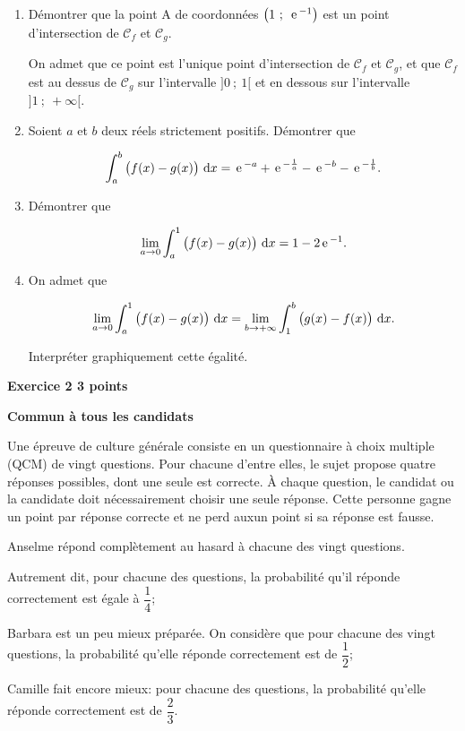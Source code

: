 \documentclass[10pt,a4paper]{article}
\renewcommand{\d}{\mathrm{\,d}}%
\newcommand{\e}{\mathrm{\,e\,}}%
\newcommand{\ds}{\displaystyle}
\begin{document}
\begin{enumerate}
\item Démontrer que la point A de coordonnées $\left (1~;~\e^{-1}\strut\right )$ est un point d'intersection de $\mathcal{C}_f$ et $\mathcal{C}_g$.

\smallskip

On admet que ce point est l'unique point d'intersection de $\mathcal{C}_f$ et $\mathcal{C}_g$, et que $\mathcal{C}_f$ est au dessus de $\mathcal{C}_g$ sur l'intervalle $]0~;~1[$ et en dessous sur l'intervalle $]1~;~+\infty[$.

\item Soient $a$ et $b$ deux réels strictement positifs. Démontrer que

\[\ds\int_{a}^{b} \left ( f(x)-g(x)\strut\right ) \d x = \e^{-a} + \e^{-\frac{1}{a}} - \e^{-b} - \e^{-\frac{1}{b}}.\]

\item Démontrer que

\[\ds\lim_{a\to 0} \ds\int_{a}^{1} \left ( f(x)-g(x)\strut\right ) \d x =1-2\e^{-1}.\]

\item On admet que

\[\ds\lim_{a\to 0} \ds\int_{a}^{1} \left ( f(x)-g(x)\strut\right ) \d x =\ds\lim_{b\to +\infty} \ds\int_{1}^{b} \left ( g(x)-f(x)\strut\right ) \d x .\]

Interpréter graphiquement cette égalité.

\end{enumerate}

\vspace{0,25cm}

\textbf{Exercice 2 \hfill 3 points}

\medskip

\textbf{Commun à tous les candidats}

\bigskip

Une épreuve de culture générale consiste en un questionnaire à choix multiple (QCM) de vingt questions. Pour chacune d'entre elles, le sujet propose quatre réponses possibles, dont une seule est correcte. À chaque question, le candidat ou la candidate doit nécessairement choisir une seule réponse. Cette personne gagne un point par réponse correcte et ne perd auxun point si sa réponse est fausse.

\medskip

\begin{list}{\textbullet}{On considère trois candidats:}
\item Anselme répond complètement au hasard à chacune des vingt questions.

Autrement dit, pour chacune des questions, la probabilité qu'il réponde correctement est égale à $\dfrac{1}{4}$;
\item Barbara est un peu mieux préparée. On considère que pour chacune des vingt questions, la probabilité qu'elle réponde correctement est de $\dfrac{1}{2}$;
\item Camille fait encore mieux: pour chacune des questions, la probabilité qu'elle réponde correctement est de $\dfrac{2}{3}$.
\end{list}
\end{document}

